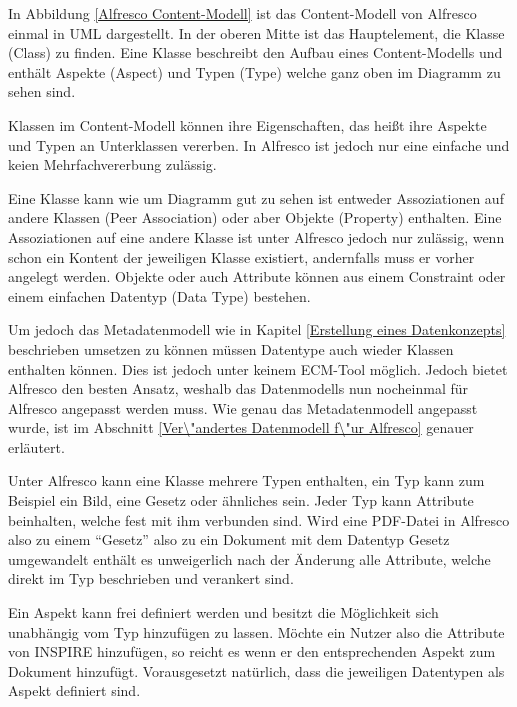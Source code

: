 In Abbildung \ref{Alfresco Content-Modell} ist das Content-Modell von Alfresco einmal in UML dargestellt. In der oberen Mitte ist das Hauptelement, die Klasse (Class) zu finden. Eine Klasse beschreibt den Aufbau eines Content-Modells und enth\"alt Aspekte (Aspect) und Typen (Type) welche ganz oben im Diagramm zu sehen sind. \cite{Professional_Alfresco}

Klassen im Content-Modell k\"onnen ihre Eigenschaften, das hei\ss{}t ihre Aspekte und Typen an Unterklassen vererben. In Alfresco ist jedoch nur eine einfache und keien Mehrfachvererbung zul\"assig.

Eine Klasse kann wie um Diagramm gut zu sehen ist entweder Assoziationen auf andere Klassen (Peer Association) oder aber Objekte (Property) enthalten. Eine Assoziationen auf eine andere Klasse ist unter Alfresco jedoch nur zul\"assig, wenn schon ein Kontent der jeweiligen Klasse existiert, andernfalls muss er vorher angelegt werden. Objekte oder auch Attribute k\"onnen aus einem Constraint oder einem einfachen Datentyp (Data Type) bestehen.

Um jedoch das Metadatenmodell wie in Kapitel \ref{Erstellung eines Datenkonzepts} beschrieben umsetzen zu k\"onnen m\"ussen Datentype auch wieder Klassen enthalten k\"onnen. Dies ist jedoch unter keinem \ac{ECM}-Tool m\"oglich. Jedoch bietet Alfresco den besten Ansatz, weshalb das Datenmodells nun nocheinmal f\"ur Alfresco angepasst werden muss. Wie genau das Metadatenmodell angepasst wurde, ist im Abschnitt \ref{Ver\"andertes Datenmodell f\"ur Alfresco} genauer erl\"autert.

Unter Alfresco kann eine Klasse mehrere Typen enthalten, ein Typ kann zum Beispiel ein Bild, eine Gesetz oder \"ahnliches sein. Jeder Typ kann Attribute beinhalten, welche fest mit ihm verbunden sind. Wird eine PDF-Datei in Alfresco also zu einem "`Gesetz"' also zu ein Dokument mit dem Datentyp Gesetz umgewandelt enth\"alt es unweigerlich nach der \"Anderung alle Attribute, welche direkt im Typ beschrieben und verankert sind.

Ein Aspekt kann frei definiert werden und besitzt die M\"oglichkeit sich unabh\"angig vom Typ hinzuf\"ugen zu lassen. M\"ochte ein Nutzer also die Attribute von \ac{INSPIRE} hinzuf\"ugen, so reicht es wenn er den entsprechenden Aspekt zum Dokument hinzuf\"ugt. Vorausgesetzt nat\"urlich, dass die jeweiligen Datentypen als Aspekt definiert sind.

